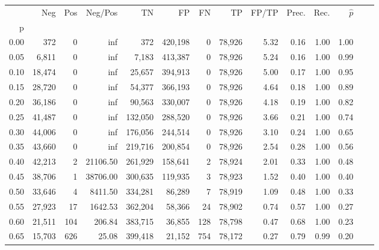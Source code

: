 \begin{tabular}{rrrrrrrrrrrrrr}
\toprule
{} &     Neg &     Pos &   Neg/Pos &       TN &       FP &      FN &      TP & FP/TP & Prec. &  Rec. & $\hat{p}$ \\
p    &         &         &           &          &          &         &         &       &       &       &           \\
\midrule
0.00 &     372 &       0 &       inf &      372 &  420,198 &       0 &  78,926 &  5.32 &  0.16 &  1.00 &      1.00 \\
0.05 &   6,811 &       0 &       inf &    7,183 &  413,387 &       0 &  78,926 &  5.24 &  0.16 &  1.00 &      0.99 \\
0.10 &  18,474 &       0 &       inf &   25,657 &  394,913 &       0 &  78,926 &  5.00 &  0.17 &  1.00 &      0.95 \\
0.15 &  28,720 &       0 &       inf &   54,377 &  366,193 &       0 &  78,926 &  4.64 &  0.18 &  1.00 &      0.89 \\
0.20 &  36,186 &       0 &       inf &   90,563 &  330,007 &       0 &  78,926 &  4.18 &  0.19 &  1.00 &      0.82 \\
0.25 &  41,487 &       0 &       inf &  132,050 &  288,520 &       0 &  78,926 &  3.66 &  0.21 &  1.00 &      0.74 \\
0.30 &  44,006 &       0 &       inf &  176,056 &  244,514 &       0 &  78,926 &  3.10 &  0.24 &  1.00 &      0.65 \\
0.35 &  43,660 &       0 &       inf &  219,716 &  200,854 &       0 &  78,926 &  2.54 &  0.28 &  1.00 &      0.56 \\
0.40 &  42,213 &       2 &  21106.50 &  261,929 &  158,641 &       2 &  78,924 &  2.01 &  0.33 &  1.00 &      0.48 \\
0.45 &  38,706 &       1 &  38706.00 &  300,635 &  119,935 &       3 &  78,923 &  1.52 &  0.40 &  1.00 &      0.40 \\
0.50 &  33,646 &       4 &   8411.50 &  334,281 &   86,289 &       7 &  78,919 &  1.09 &  0.48 &  1.00 &      0.33 \\
0.55 &  27,923 &      17 &   1642.53 &  362,204 &   58,366 &      24 &  78,902 &  0.74 &  0.57 &  1.00 &      0.27 \\
0.60 &  21,511 &     104 &    206.84 &  383,715 &   36,855 &     128 &  78,798 &  0.47 &  0.68 &  1.00 &      0.23 \\
0.65 &  15,703 &     626 &     25.08 &  399,418 &   21,152 &     754 &  78,172 &  0.27 &  0.79 &  0.99 &      0.20 \\

\end{tabular}
